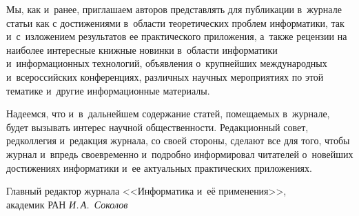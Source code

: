 {{{Мы, как и~ранее, приглашаем авторов представлять для публикации в~журнале 
статьи как с достижениями в~области теоретических проблем информатики, так 
и~с~изложением результатов ее практического приложения, а~также 
рецензии на наиболее интересные книжные новинки в~области информатики 
и~информационных технологий, объявления о~крупнейших международных 
и~всероссийских конференциях, различных научных мероприятиях 
по этой тематике и~другие информационные материалы.

Надеемся, что и~в~дальнейшем содержание статей, помещаемых в~журнале, 
будет вызывать интерес научной общественности. Редакционный совет, редколлегия 
и~редакция журнала, со своей стороны, сделают все для того, 
чтобы журнал и~впредь своевременно и~подробно информировал читателей 
о~новейших достижениях информатики и~ее актуальных практических приложениях.

                

      
\vfill
\noindent
Главный редактор журнала <<Информатика и~её применения>>,\\
академик  РАН\hfill
\textit{И.\,А.~Соколов}\\[-6pt]



} }
}
      